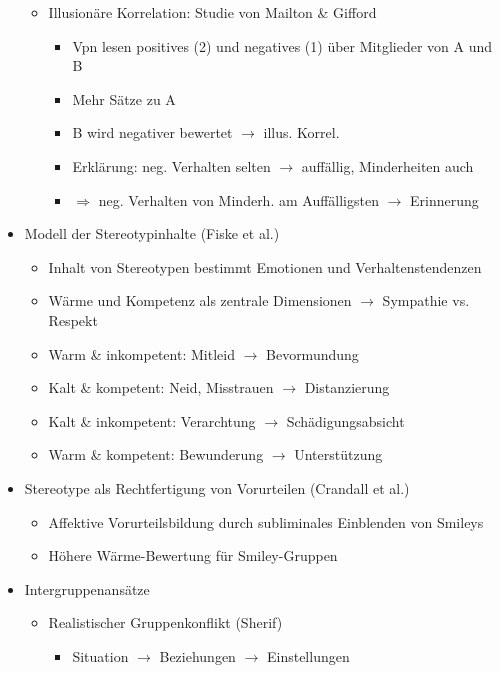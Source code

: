\documentclass[11pt, paper=a4, twocolumn]{scrartcl}
\begin{document}
\begin{itemize}
\begin{itemize}
					\item Illusionäre Korrelation: Studie von Mailton \& Gifford
						\begin{itemize}
							\item Vpn lesen positives (2) und negatives (1) über Mitglieder von A und B
							\item Mehr Sätze zu A
							\item B wird negativer bewertet $\rightarrow$ illus. Korrel.
							\item Erklärung: neg. Verhalten selten $\rightarrow$ auffällig, Minderheiten auch
							\item $\Rightarrow$ neg. Verhalten von Minderh. am Auffälligsten $\rightarrow$ Erinnerung
						\end{itemize}
				\end{itemize}
			\item Modell der Stereotypinhalte (Fiske et al.)
				\begin{itemize}
					\item Inhalt von Stereotypen bestimmt Emotionen und Verhaltenstendenzen
					\item Wärme und Kompetenz als zentrale Dimensionen $\rightarrow$ Sympathie vs. Respekt
					\item Warm \& inkompetent: Mitleid $\rightarrow$ Bevormundung
					\item Kalt \& kompetent: Neid, Misstrauen $\rightarrow$ Distanzierung
					\item Kalt \& inkompetent: Verarchtung $\rightarrow$ Schädigungsabsicht
					\item Warm \& kompetent: Bewunderung $\rightarrow$ Unterstützung
				\end{itemize}
			\item Stereotype als Rechtfertigung von Vorurteilen (Crandall et al.)
				\begin{itemize}
					\item Affektive Vorurteilsbildung durch subliminales Einblenden von Smileys
					\item Höhere Wärme-Bewertung für Smiley-Gruppen
				\end{itemize}
			\item Intergruppenansätze
				\begin{itemize}
					\item Realistischer Gruppenkonflikt (Sherif)
						\begin{itemize}
							\item Situation $\rightarrow$ Beziehungen $\rightarrow$ Einstellungen

\end{itemize}
\end{itemize}
\end{itemize}
\end{document}
